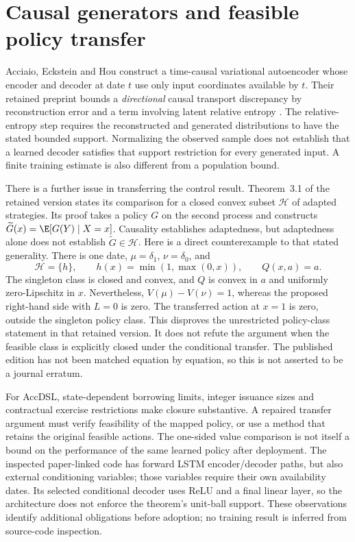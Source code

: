 


\section{Causal generators and feasible policy transfer}
Acciaio, Eckstein and Hou construct a time-causal variational autoencoder whose
encoder and decoder at date $t$ use only input coordinates available by $t$.
Their retained preprint bounds a \emph{directional} causal transport discrepancy
by reconstruction error and a term involving latent relative entropy
\cite[Lemma~2.4, Theorem~2.5 and Corollary~2.6]{litclosetcvae}. The relative-entropy
step requires the reconstructed and generated distributions to have the stated
bounded support. Normalizing the observed sample does not establish that a
learned decoder satisfies that support restriction for every generated input.
A finite training estimate is also different from a population bound.

There is a further issue in transferring the control result. Theorem~3.1 of
the retained version states its comparison for a closed convex subset
$\mathcal H$ of adapted strategies. Its proof takes a policy $G$ on the second
process and constructs $\widetilde G(x)=\E[G(Y)\mid X=x]$. Causality establishes
adaptedness, but adaptedness alone does not establish
$\widetilde G\in\mathcal H$. Here is a direct counterexample to that stated
generality. There is one date, $\mu=\delta_1$, $\nu=\delta_0$, and
\begin{equation}
\mathcal H=\{h\},\qquad h(x)=\min(1,\max(0,x)),\qquad Q(x,a)=a.
\end{equation}
The singleton class is closed and convex, and $Q$ is convex in $a$ and
uniformly zero-Lipschitz in $x$. Nevertheless,
$V(\mu)-V(\nu)=1$, whereas the proposed right-hand side with $L=0$ is zero.
The transferred action at $x=1$ is zero, outside the singleton policy class.
This disproves the unrestricted policy-class statement in that retained
version. It does not refute the argument when the feasible class is explicitly
closed under the conditional transfer. The published edition has not been
matched equation by equation, so this is not asserted to be a journal erratum.

For AccDSL, state-dependent borrowing limits, integer issuance sizes and
contractual exercise restrictions make closure substantive. A repaired transfer
argument must verify feasibility of the mapped policy, or use a method that
retains the original feasible actions. The one-sided value comparison is not
itself a bound on the performance of the same learned policy after deployment.
The inspected paper-linked code has forward LSTM encoder/decoder paths, but
also external conditioning variables; those variables require their own
availability dates. Its selected conditional decoder uses ReLU and a final
linear layer, so the architecture does not enforce the theorem's unit-ball
support. These observations identify additional obligations before adoption;
no training result is inferred from source-code inspection.

